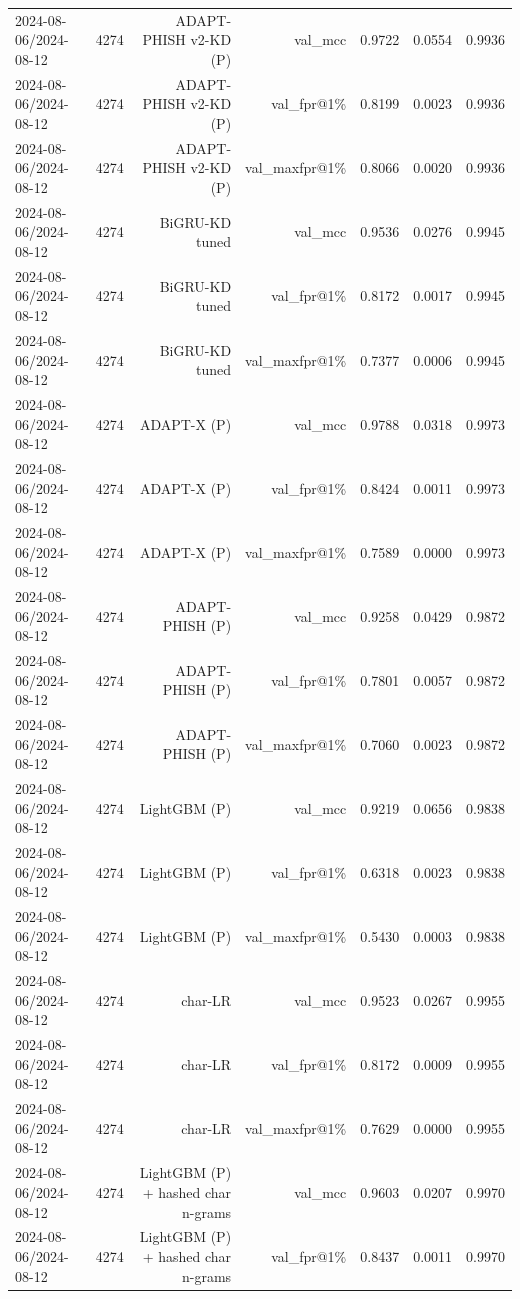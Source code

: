 \begin{table}[t]
\begin{tabular}{llrrrrr}
2024-08-06/2024-08-12 & 4274 & ADAPT-PHISH v2-KD (P) & val\_mcc & 0.9722 & 0.0554 & 0.9936 \\
2024-08-06/2024-08-12 & 4274 & ADAPT-PHISH v2-KD (P) & val\_fpr@1\% & 0.8199 & 0.0023 & 0.9936 \\
2024-08-06/2024-08-12 & 4274 & ADAPT-PHISH v2-KD (P) & val\_maxfpr@1\% & 0.8066 & 0.0020 & 0.9936 \\
2024-08-06/2024-08-12 & 4274 & BiGRU-KD tuned & val\_mcc & 0.9536 & 0.0276 & 0.9945 \\
2024-08-06/2024-08-12 & 4274 & BiGRU-KD tuned & val\_fpr@1\% & 0.8172 & 0.0017 & 0.9945 \\
2024-08-06/2024-08-12 & 4274 & BiGRU-KD tuned & val\_maxfpr@1\% & 0.7377 & 0.0006 & 0.9945 \\
2024-08-06/2024-08-12 & 4274 & ADAPT-X (P) & val\_mcc & 0.9788 & 0.0318 & 0.9973 \\
2024-08-06/2024-08-12 & 4274 & ADAPT-X (P) & val\_fpr@1\% & 0.8424 & 0.0011 & 0.9973 \\
2024-08-06/2024-08-12 & 4274 & ADAPT-X (P) & val\_maxfpr@1\% & 0.7589 & 0.0000 & 0.9973 \\
2024-08-06/2024-08-12 & 4274 & ADAPT-PHISH (P) & val\_mcc & 0.9258 & 0.0429 & 0.9872 \\
2024-08-06/2024-08-12 & 4274 & ADAPT-PHISH (P) & val\_fpr@1\% & 0.7801 & 0.0057 & 0.9872 \\
2024-08-06/2024-08-12 & 4274 & ADAPT-PHISH (P) & val\_maxfpr@1\% & 0.7060 & 0.0023 & 0.9872 \\
2024-08-06/2024-08-12 & 4274 & LightGBM (P) & val\_mcc & 0.9219 & 0.0656 & 0.9838 \\
2024-08-06/2024-08-12 & 4274 & LightGBM (P) & val\_fpr@1\% & 0.6318 & 0.0023 & 0.9838 \\
2024-08-06/2024-08-12 & 4274 & LightGBM (P) & val\_maxfpr@1\% & 0.5430 & 0.0003 & 0.9838 \\
2024-08-06/2024-08-12 & 4274 & char-LR & val\_mcc & 0.9523 & 0.0267 & 0.9955 \\
2024-08-06/2024-08-12 & 4274 & char-LR & val\_fpr@1\% & 0.8172 & 0.0009 & 0.9955 \\
2024-08-06/2024-08-12 & 4274 & char-LR & val\_maxfpr@1\% & 0.7629 & 0.0000 & 0.9955 \\
2024-08-06/2024-08-12 & 4274 & LightGBM (P) + hashed char n-grams & val\_mcc & 0.9603 & 0.0207 & 0.9970 \\
2024-08-06/2024-08-12 & 4274 & LightGBM (P) + hashed char n-grams & val\_fpr@1\% & 0.8437 & 0.0011 & 0.9970 \\

\end{tabular}
\end{table}
